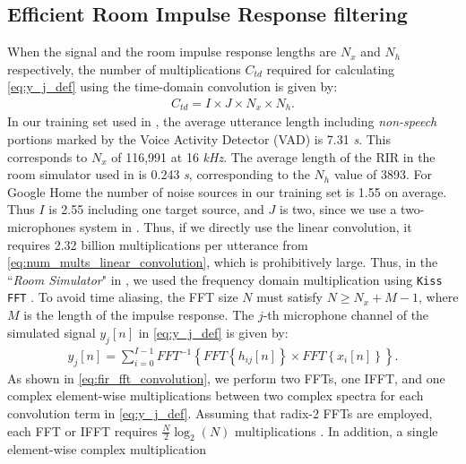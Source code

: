 \documentclass[a4paper]{article}
\begin{document}
%
%
%
\subsection{Efficient Room Impulse Response filtering}
%
%
%
When the signal and the room impulse response lengths are $N_x$ and
$N_h$ respectively, the number of multiplications $C_{td}$ required for
calculating \eqref{eq:y_j_def} using the time-domain convolution is given by:
\begin{align}
  C_{td} = I \times J \times N_x \times N_h.
  \label{eq:num_mults_linear_convolution}
\end{align}
In our training set used in \cite{C_Kim_INTERSPEECH_2017_1, B_Li_INTERSPEECH_2017_1},
the average utterance length including \emph{non-speech} portions
marked by the Voice Activity Detector (VAD) is 7.31 \textit{s}.
This corresponds to $N_x$ of 116,991 at 16 \textit{kHz}. The average
length of the RIR in the room simulator used in
\cite{C_Kim_INTERSPEECH_2017_1} is 0.243 \textit{s}, corresponding
to the $N_h$ value of 3893.
For Google Home the number of noise sources in our training
set is 1.55 on average.
Thus $I$ is 2.55 including one target source, and $J$ is two, since
we use a two-microphones system in
\cite{C_Kim_INTERSPEECH_2017_1, B_Li_INTERSPEECH_2017_1}.
Thus, if we directly use the linear convolution, it requires
2.32 billion multiplications per utterance from
\eqref{eq:num_mults_linear_convolution}, which is prohibitively large.
Thus, in the ``\textit{Room Simulator}" in
\cite{C_Kim_INTERSPEECH_2017_1},
we used the frequency domain multiplication using \texttt{Kiss FFT}
\cite{M_Borgerding_kiss_fft_2010}. To avoid time aliasing,
the FFT size $N$ must satisfy $N \ge N_x + M - 1$, where
$M$ is the length of the impulse response.
The $j$-th microphone channel
of the simulated signal $y_j[n]$ in \eqref{eq:y_j_def}
is given by:
\begin{align}
  y_{j} [n] = \sum_{i=0}^{I-1}FFT^{-1} \left \{
      FFT \left \{ h_{ij}[n] \right \} \times
      FFT \left \{ x_i[n] \right \}
      \right \}.  %
  \label{eq:fir_fft_convolution}
\end{align}
As shown in \eqref{eq:fir_fft_convolution}, we perform
two FFTs, one IFFT, and one complex element-wise multiplications
between two complex spectra for each convolution term in \eqref{eq:y_j_def}.
Assuming that radix-2 FFTs are employed, each FFT or IFFT requires
$\frac{N}{2} \log_2(N)$ multiplications
\cite{A_V_Oppenheim_PrenticeHall_1999}.
In addition, a single element-wise complex multiplication
\end{document}

